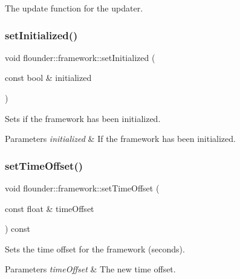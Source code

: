 The update function for the updater. 

\mbox{\label{classflounder_1_1framework_a06963c9a669b09c6e33547a6766432df}} 
\subsubsection{\texorpdfstring{set\+Initialized()}{setInitialized()}}
{\footnotesize\ttfamily void flounder\+::framework\+::set\+Initialized (\begin{DoxyParamCaption}\item[{const bool \&}]{initialized }\end{DoxyParamCaption})\hspace{0.3cm}{\ttfamily [inline]}}



Sets if the framework has been initialized. 


\begin{DoxyParams}{Parameters}
{\em initialized} & If the framework has been initialized. \\
\hline
\end{DoxyParams}
\mbox{\label{classflounder_1_1framework_a572ccf8c4d7c90687b35bc7efc94c0e2}} 
\subsubsection{\texorpdfstring{set\+Time\+Offset()}{setTimeOffset()}}
{\footnotesize\ttfamily void flounder\+::framework\+::set\+Time\+Offset (\begin{DoxyParamCaption}\item[{const float \&}]{time\+Offset }\end{DoxyParamCaption}) const\hspace{0.3cm}{\ttfamily [inline]}}



Sets the time offset for the framework (seconds). 


\begin{DoxyParams}{Parameters}
{\em time\+Offset} & The new time offset. \\
\hline
\end{DoxyParams}
\mbox{\label{classflounder_1_1framework_abfa2c0da27ab46791ee7877115afffa3}} 
